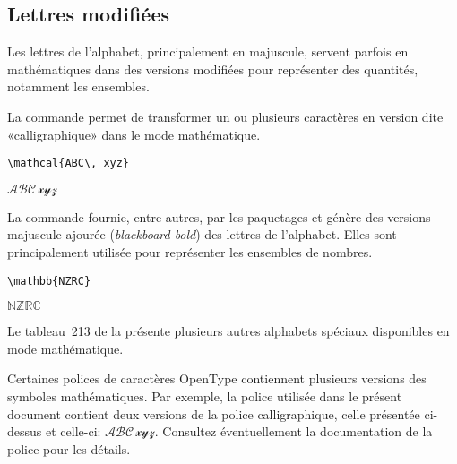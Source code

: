 \subsection{Lettres modifiées}
\label{sec:math:symboles:mathcal}

Les lettres de l'alphabet, principalement en majuscule, servent
parfois en mathématiques dans des versions modifiées pour représenter
des quantités, notamment les ensembles.

La commande \cmd{\mathcal} permet de transformer un ou plusieurs
caractères en version dite «calligraphique» dans le mode mathématique.
\begin{demo}
  \begin{texample}
\begin{lstlisting}
\mathcal{ABC\, xyz}
\end{lstlisting}
    \producing
    $\mathscr{ABC\, xyz}$
  \end{texample}
\end{demo}

La commande \cmd{\mathbb} fournie, entre autres, par les paquetages
 et  génère des versions majuscule
ajourée (\emph{blackboard bold}) des lettres de l'alphabet. Elles sont
principalement utilisée pour représenter les ensembles de nombres.
\begin{demo}
  \begin{texample}
\begin{lstlisting}
\mathbb{NZRC}
\end{lstlisting}
    \producing $\mathbb{NZRC}$
  \end{texample}
\end{demo}

Le tableau~213 de la %
présente plusieurs autres alphabets spéciaux disponibles en mode
mathématique.

\begin{conseil}
  Certaines polices de caractères OpenType contiennent plusieurs
  versions des symboles mathématiques. Par exemple, la police utilisée
  dans le présent document contient deux versions de la police
  calligraphique, celle présentée ci-dessus et celle-ci: %
  $\mathscr{ABC\, xyz}$. Consultez éventuellement la documentation de
  la police pour les détails.
\end{conseil}

